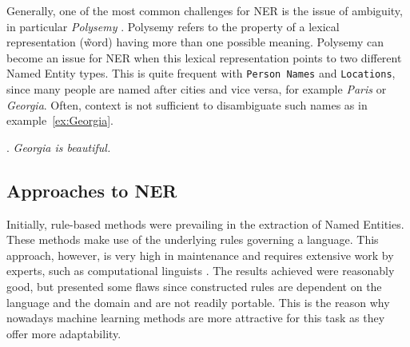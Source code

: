 \documentclass[11pt]{article}
\begin{document}
Generally, one of the most common challenges for NER is the issue of ambiguity, in particular \emph{Polysemy} \cite{nadeau2007survey}. %
Polysemy refers to the property of a lexical representation (\~ word) having more than one possible meaning. Polysemy can become an issue for NER when this lexical representation 
points to two different Named Entity types.
This is quite frequent with \texttt{Person Names} and \texttt{Locations}, since many people are named after cities and vice versa, for example \emph{Paris} or \emph{Georgia}. 
Often, context is not sufficient to disambiguate such names as in example~\ref{ex:Georgia}.

\ex. \emph{Georgia is beautiful.} \label{ex:Georgia}




\subsection{Approaches to NER}

Initially, rule-based methods were prevailing in the extraction of Named Entities. These methods make use of the underlying rules governing a language.
This approach, however, is very high in maintenance and requires extensive work by experts, such as computational linguists \cite{nadeau2007survey}.
The results achieved were reasonably good, but presented some flaws since constructed rules are dependent on the language and the domain and are not readily portable. 
This is the reason why nowadays machine learning methods are more attractive for this task as they offer more adaptability. 
\end{document}
